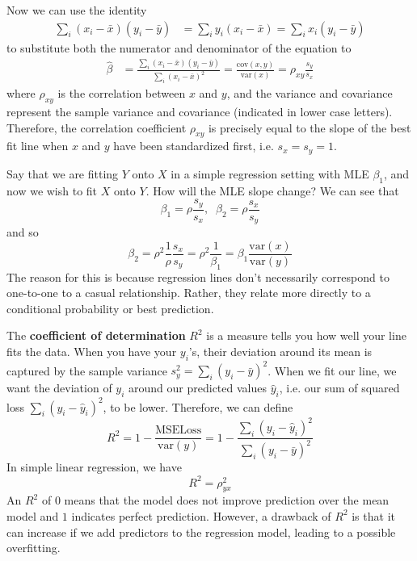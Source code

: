   Now we can use the identity
  \begin{align*}
    \sum_{i} (x_i - \bar{x}) (y_i - \bar{y}) & = \sum_i y_i (x_i - \bar{x}) = \sum_i x_i (y_i - \bar{y}) 
  \end{align*}
  to substitute both the numerator and denominator of the equation to 
  \begin{align*}
    \hat{\beta} & = \frac{\sum_i (x_i - \bar{x}) (y_i - \bar{y})}{\sum_i (x_i - \bar{x})^2} = \frac{\mathrm{cov}(x, y)}{\mathrm{var}(x)} = \rho_{xy} \frac{s_y}{s_x}
  \end{align*}
  where $\rho_{xy}$ is the correlation between $x$ and $y$, and the variance and covariance represent the sample variance and covariance (indicated in lower case letters). Therefore, the correlation coefficient $\rho_{xy}$ is precisely equal to the slope of the best fit line when $x$ and $y$ have been standardized first, i.e. $s_x = s_y = 1$. 

  \begin{example}
    Say that we are fitting $Y$ onto $X$ in a simple regression setting with MLE $\beta_1$, and now we wish to fit $X$ onto $Y$. How will the MLE slope change? We can see that 
    \[\beta_1 = \rho \frac{s_y}{s_x} , \;\; \beta_2 = \rho \frac{s_x}{s_y}\]
    and so 
    \[\beta_2 = \rho^2 \frac{1}{\rho} \frac{s_x}{s_y} = \rho^2 \frac{1}{\beta_1} = \beta_1 \frac{\mathrm{var}(x)}{\mathrm{var}(y)}\]
    The reason for this is because regression lines don't necessarily correspond to one-to-one to a casual relationship. Rather, they relate more directly to a conditional probability or best prediction. 
  \end{example}

  The \textbf{coefficient of determination} $R^2$ is a measure tells you how well your line fits the data. When you have your $y_i$'s, their deviation around its mean is captured by the sample variance $s^2_y = \sum_i (y_i - \bar{y})^2$. When we fit our line, we want the deviation of $y_i$ around our predicted values $\hat{y}_i$, i.e. our sum of squared loss $\sum_i (y_i - \hat{y}_i)^2$, to be lower. Therefore, we can define 
  \[R^2 = 1 - \frac{\mathrm{MSE Loss}}{\mathrm{var}(y)} = 1 - \frac{\sum_i (y_i - \hat{y}_i)^2}{\sum_i (y_i - \bar{y})^2}\]
  In simple linear regression, we have 
  \[R^2 = \rho_{yx}^2\]
  An $R^2$ of $0$ means that the model does not improve prediction over the mean model and $1$ indicates perfect prediction. However, a drawback of $R^2$ is that it can increase if we add predictors to the regression model, leading to a possible overfitting. 

